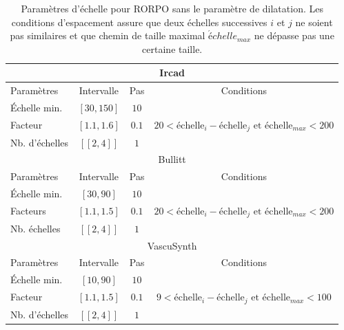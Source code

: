 \begin{table}[H]
  \caption{ Paramètres d'échelle pour RORPO sans le paramètre de dilatation. Les conditions d'espacement assure que deux échelles successives $i$ et $j$  ne soient pas similaires et que chemin de taille maximal $\acute{é}chelle_{max}$ ne dépasse pas une certaine taille.}
  \label{tab:SS_interval_RORPO}
  \begin{center}
    \begin{tabular}{  l  c  c  c }
      \hline
      \multicolumn{4}{c}{Ircad}\\
      \hline
      Paramètres & Intervalle & Pas & Conditions \\
      \hline
      Échelle min. & $[30,150]$ & $10$ & \\
      Facteur & $[1.1,1.6]$ & $0.1$ & $20 < \textrm{échelle}_{i} - \textrm{échelle}_{j} \textrm{~et~} \textrm{échelle}_{max} < 200 $ \\ 
      Nb. d'échelles & $[\![2,4]\!]$ & $1$ & \\
      \hline
      \hline
      \multicolumn{4}{c}{Bullitt}\\
      \hline
      Paramètres & Intervalle & Pas & Conditions \\
      \hline
      Échelle min. & $[30,90]$ & $10$ & \\
      
      Facteurs & $[1.1,1.5]$  & $0.1$ & $ 20 < \textrm{échelle}_{i} - \textrm{échelle}_{j} \textrm{~et~} \textrm{échelle}_{max} < 200$ \\
      Nb. échelles & $[\![2,4]\!]$ & $1$ & \\
      \hline
      \hline
      \multicolumn{4}{c}{VascuSynth}\\
      \hline
      Paramètres & Intervalle & Pas & Conditions \\
      \hline
      Échelle min. & $[10,90]$ & $10$ & \\
      
      Facteur & $[1.1,1.5]$  &  $0.1$ & $ 9 < \textrm{échelle}_{i} - \textrm{échelle}_{j} \textrm{~et~} \textrm{échelle}_{max} < 100$ \\
      
      Nb. d'échelles & $[\![2,4]\!]$ & $1$ & \\
      \hline
    \end{tabular}
  \end{center}
\end{table}

